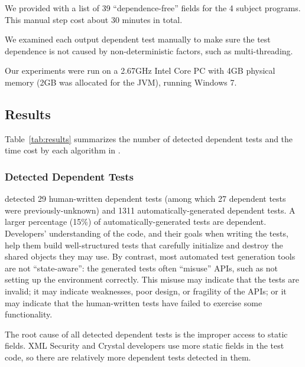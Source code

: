 We provided \ourtool with a list of 39 ``dependence-free'' fields
for the 4 subject programs. This manual step cost
about 30 minutes in total.


We examined each output dependent test manually to make
sure the test dependence is not caused by non-deterministic
factors, such as multi-threading.

Our experiments were run on a 2.67GHz Intel Core PC
with 4GB physical memory (2GB was allocated for the JVM),
running Windows 7.

\subsection{Results}

Table~\ref{tab:results} summarizes the number of detected
dependent tests and the time cost by each algorithm
in \ourtool.

\subsubsection{Detected Dependent Tests}
\label{sec:detectedtests}


\ourtool detected 29 human-written dependent tests (among which 27
dependent tests were previously-unknown) and 1311
automatically-generated dependent tests.  A larger percentage (15\%) of
automatically-generated tests are dependent.  Developers' understanding of
the code, and their goals when writing the tests, help them build
well-structured tests that carefully initialize and destroy the shared
objects they may use.
By contrast,  most automated test generation tools are not ``state-aware'': the
generated tests often ``misuse'' APIs, such as not setting up
the environment correctly.  This misuse may
indicate that the tests are invalid; it may indicate weaknesses, poor
design, or fragility of the APIs; or it may indicate that the human-written
tests have failed to exercise some functionality.

The root cause of all detected dependent tests is the improper access to
static fields. XML Security and Crystal developers use more
static fields in the test code,
so there are relatively more dependent tests detected in them.

